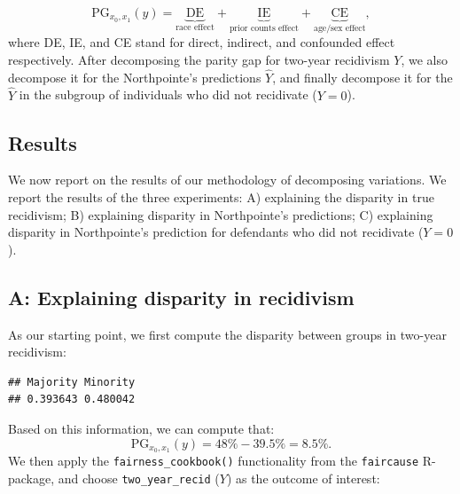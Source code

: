 \documentclass{article}
\newenvironment{Shaded}{\begin{snugshade}}{\end{snugshade}}
\newcommand{\FunctionTok}[1]{\textcolor[rgb]{0.00,0.00,0.00}{#1}}
\newcommand{\NormalTok}[1]{#1}
\newcommand{\SpecialCharTok}[1]{\textcolor[rgb]{0.00,0.00,0.00}{#1}}
\begin{document}
\begin{equation}
  \text{PG}_{x_0, x_1}(y) = \underbrace{\text{DE}}_{\text{race effect}} +  \underbrace{\text{IE}}_{\text{prior counts effect}} +  \underbrace{\text{CE}}_{\text{age/sex effect}},
\end{equation} where DE, IE, and CE stand for direct, indirect, and
confounded effect respectively. After decomposing the parity gap for
two-year recidivism \(Y\), we also decompose it for the Northpointe's
predictions \(\hat{Y}\), and finally decompose it for the \(\hat{Y}\) in
the subgroup of individuals who did not recidivate (\(Y = 0\)).

\hypertarget{results}{%
\subsection{Results}\label{results}}

We now report on the results of our methodology of decomposing
variations. We report the results of the three experiments: A)
explaining the disparity in true recidivism; B) explaining disparity in
Northpointe's predictions; C) explaining disparity in Northpointe's
prediction for defendants who did not recidivate (\(Y = 0\)).

\hypertarget{a-explaining-disparity-in-recidivism}{%
\subsection{A: Explaining disparity in
recidivism}\label{a-explaining-disparity-in-recidivism}}

As our starting point, we first compute the disparity between groups in
two-year recidivism:

\begin{Shaded}
\end{Shaded}

\begin{verbatim}
## Majority Minority 
## 0.393643 0.480042
\end{verbatim}

Based on this information, we can compute that: \begin{equation}
  \text{PG}_{x_0, x_1}(y) = 48\% - 39.5\% = 8.5\%.
\end{equation} We then apply the \texttt{fairness\_cookbook()}
functionality from the \texttt{faircause} R-package, and choose
\texttt{two\_year\_recid} (\(Y\)) as the outcome of interest:
\end{document}
